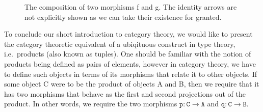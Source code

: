 \documentclass[12pt,twoside,maitrise]{dms}
\theoremstyle{definition}
\numberwithin{equation}{section}
\numberwithin{table}{chapter}
\numberwithin{figure}{chapter}
\newcommand\id[1] {\texttt{#1}}
\begin{document}
\begin{figure}[H]

\caption{The composition of two morphisms f and g. The identity arrows are not explicitly shown as we can take their existence for granted.}

\end{figure}

To conclude our short introduction to category theory, we would like to present the category theoretic equivalent of a ubiqituous construct in type theory, i.e.\ products (also known as tuples). One should be familiar with the notion of products being defined as pairs of elements, however in category theory, we have to define such objects in terms of its morphisms that relate it to other objects. If some object C were to be the product of objects A and B, then we require that it has two morphisms that behave as the first and second projections out of the product. In other words, we require the two morphisms $\id{p} : \id{C} \rightarrow \id{A}$ and $\id{q} : \id{C} \rightarrow \id{B}$.
\end{document}
